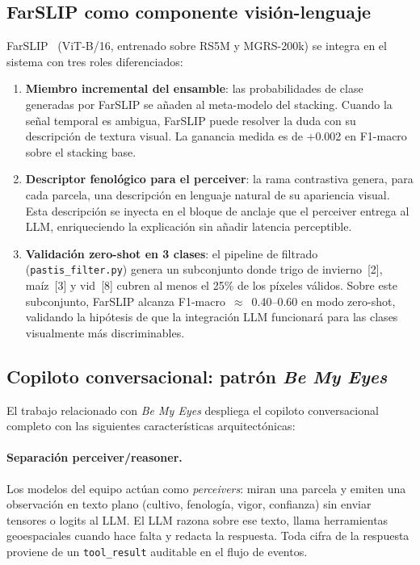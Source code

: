 \documentclass{article}
\begin{document}
\subsection{FarSLIP como componente visión-lenguaje}

FarSLIP~\cite{li2025farslip} (ViT-B/16, entrenado sobre RS5M y MGRS-200k)
se integra en el sistema con tres roles diferenciados:

\begin{enumerate}[leftmargin=*]
    \item \textbf{Miembro incremental del ensamble}: las probabilidades de
    clase generadas por FarSLIP se añaden al meta-modelo del stacking.
    Cuando la señal temporal es ambigua, FarSLIP puede resolver la duda
    con su descripción de textura visual. La ganancia medida es de +0.002
    en F1-macro sobre el stacking base.

    \item \textbf{Descriptor fenológico para el perceiver}: la rama
    contrastiva genera, para cada parcela, una descripción en lenguaje
    natural de su apariencia visual. Esta descripción se inyecta en el
    bloque de anclaje que el perceiver entrega al LLM, enriqueciendo la
    explicación sin añadir latencia perceptible.

    \item \textbf{Validación zero-shot en 3 clases}: el pipeline de
    filtrado (\texttt{pastis\_filter.py}) genera un subconjunto donde
    trigo de invierno~[2], maíz~[3] y vid~[8] cubren al menos el 25\%
    de los píxeles válidos. Sobre este subconjunto, FarSLIP alcanza
    F1-macro~$\approx$~0.40--0.60 en modo zero-shot, validando la hipótesis
    de que la integración LLM funcionará para las clases visualmente
    más discriminables.
\end{enumerate}

\subsection{Copiloto conversacional: patrón \textit{Be My Eyes}}

El trabajo relacionado con \textit{Be My Eyes} despliega el copiloto conversacional completo con las
siguientes características arquitectónicas:

\paragraph{Separación perceiver/reasoner.}
Los modelos del equipo actúan como \textit{perceivers}: miran una parcela
y emiten una observación en texto plano (cultivo, fenología, vigor,
confianza) sin enviar tensores o logits al LLM. El LLM razona sobre ese
texto, llama herramientas geoespaciales cuando hace falta y redacta la
respuesta. Toda cifra de la respuesta proviene de un \texttt{tool\_result}
auditable en el flujo de eventos.
\end{document}
